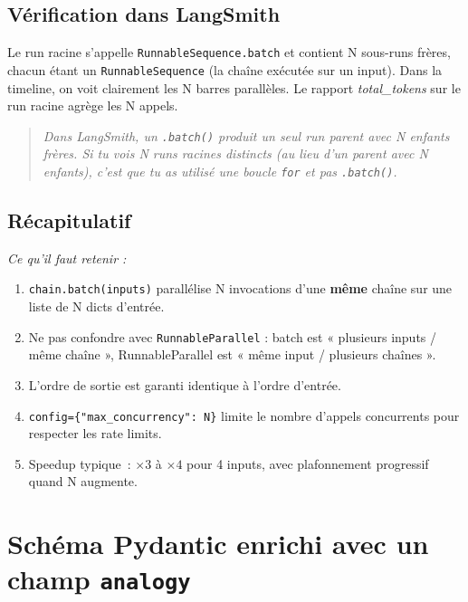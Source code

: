 \documentclass[11pt,a4paper]{article}
\begin{document}
\subsection{Vérification dans LangSmith}

Le run racine s'appelle \texttt{RunnableSequence.batch} et contient N
sous-runs frères, chacun étant un \texttt{RunnableSequence} (la chaîne
exécutée sur un input). Dans la timeline, on voit clairement les N barres
parallèles. Le rapport \emph{total\_tokens} sur le run racine agrège les
N appels.

\begin{quote}\itshape
Dans LangSmith, un \texttt{.batch()} produit un seul run parent avec N
enfants frères. Si tu vois N runs racines distincts (au lieu d'un parent
avec N enfants), c'est que tu as utilisé une boucle \texttt{for} et pas
\texttt{.batch()}.
\end{quote}

\subsection*{Récapitulatif}
{\itshape\sloppy
\textit{Ce qu'il faut retenir :}
\begin{enumerate}[leftmargin=*]
  \item \texttt{chain.batch(inputs)} parallélise N invocations d'une
        \textbf{même} chaîne sur une liste de N dicts d'entrée.
  \item Ne pas confondre avec \texttt{RunnableParallel} : batch est
        « plusieurs inputs / même chaîne », RunnableParallel est
        « même input / plusieurs chaînes ».
  \item L'ordre de sortie est garanti identique à l'ordre d'entrée.
  \item \texttt{config=\{"max\_concurrency": N\}} limite le nombre
        d'appels concurrents pour respecter les rate limits.
  \item Speedup typique~: $\times 3$ à $\times 4$ pour 4 inputs, avec
        plafonnement progressif quand N augmente.
\end{enumerate}
\par}

\section{Schéma Pydantic enrichi avec un champ \texttt{analogy}}
\end{document}
